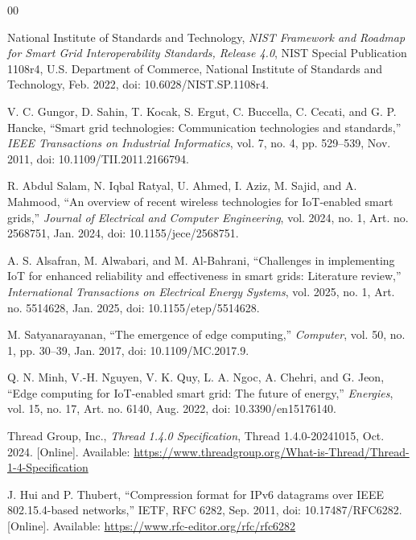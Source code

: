 \documentclass[conference]{IEEEtran}
\begin{document}
\begin{thebibliography}{00}

National Institute of Standards and Technology, \emph{NIST Framework and Roadmap for Smart Grid Interoperability Standards, Release 4.0}, NIST Special Publication 1108r4, U.S. Department of Commerce, National Institute of Standards and Technology, Feb. 2022, doi: 10.6028/NIST.SP.1108r4.

V. C. Gungor, D. Sahin, T. Kocak, S. Ergut, C. Buccella, C. Cecati, and G. P. Hancke, ``Smart grid technologies: Communication technologies and standards,'' \emph{IEEE Transactions on Industrial Informatics}, vol. 7, no. 4, pp. 529--539, Nov. 2011, doi: 10.1109/TII.2011.2166794.

R. Abdul Salam, N. Iqbal Ratyal, U. Ahmed, I. Aziz, M. Sajid, and A. Mahmood, ``An overview of recent wireless technologies for IoT-enabled smart grids,'' \emph{Journal of Electrical and Computer Engineering}, vol. 2024, no. 1, Art. no. 2568751, Jan. 2024, doi: 10.1155/jece/2568751.

A. S. Alsafran, M. Alwabari, and M. Al-Bahrani, ``Challenges in implementing IoT for enhanced reliability and effectiveness in smart grids: Literature review,'' \emph{International Transactions on Electrical Energy Systems}, vol. 2025, no. 1, Art. no. 5514628, Jan. 2025, doi: 10.1155/etep/5514628.

M. Satyanarayanan, ``The emergence of edge computing,'' \emph{Computer}, vol. 50, no. 1, pp. 30--39, Jan. 2017, doi: 10.1109/MC.2017.9.

Q. N. Minh, V.-H. Nguyen, V. K. Quy, L. A. Ngoc, A. Chehri, and G. Jeon, ``Edge computing for IoT-enabled smart grid: The future of energy,'' \emph{Energies}, vol. 15, no. 17, Art. no. 6140, Aug. 2022, doi: 10.3390/en15176140.

Thread Group, Inc., \emph{Thread 1.4.0 Specification}, Thread 1.4.0-20241015, Oct. 2024. [Online]. Available: \url{https://www.threadgroup.org/What-is-Thread/Thread-1-4-Specification}

J. Hui and P. Thubert, ``Compression format for IPv6 datagrams over IEEE 802.15.4-based networks,'' IETF, RFC 6282, Sep. 2011, doi: 10.17487/RFC6282. [Online]. Available: \url{https://www.rfc-editor.org/rfc/rfc6282}


\end{thebibliography}
\end{document}
